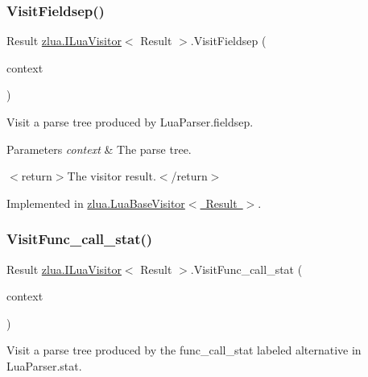 \subsubsection{\texorpdfstring{Visit\+Fieldsep()}{VisitFieldsep()}}
{\footnotesize\ttfamily Result \mbox{\hyperlink{interfacezlua_1_1_i_lua_visitor}{zlua.\+I\+Lua\+Visitor}}$<$ Result $>$.Visit\+Fieldsep (\begin{DoxyParamCaption}\item[{\mbox{[}\+Not\+Null\mbox{]} \mbox{\hyperlink{classzlua_1_1_lua_parser_1_1_fieldsep_context}{Lua\+Parser.\+Fieldsep\+Context}}}]{context }\end{DoxyParamCaption})}



Visit a parse tree produced by Lua\+Parser.\+fieldsep. 


\begin{DoxyParams}{Parameters}
{\em context} & The parse tree.\\
\hline
\end{DoxyParams}
$<$return$>$The visitor result.$<$/return$>$ 

Implemented in \mbox{\hyperlink{classzlua_1_1_lua_base_visitor_a98d3de2d27762c55d96d41ddac2f8b38}{zlua.\+Lua\+Base\+Visitor$<$ Result $>$}}.

\mbox{\label{interfacezlua_1_1_i_lua_visitor_a3e00a13013b406b034c47f9dd4bc63d5}} 
\subsubsection{\texorpdfstring{Visit\+Func\+\_\+call\+\_\+stat()}{VisitFunc\_call\_stat()}}
{\footnotesize\ttfamily Result \mbox{\hyperlink{interfacezlua_1_1_i_lua_visitor}{zlua.\+I\+Lua\+Visitor}}$<$ Result $>$.Visit\+Func\+\_\+call\+\_\+stat (\begin{DoxyParamCaption}\item[{\mbox{[}\+Not\+Null\mbox{]} \mbox{\hyperlink{classzlua_1_1_lua_parser_1_1_func__call__stat_context}{Lua\+Parser.\+Func\+\_\+call\+\_\+stat\+Context}}}]{context }\end{DoxyParamCaption})}



Visit a parse tree produced by the {\ttfamily func\+\_\+call\+\_\+stat} labeled alternative in Lua\+Parser.\+stat. 


